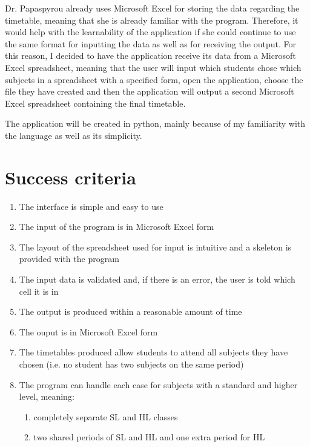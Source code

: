 \documentclass[a4paper, 12pt]{article}
\begin{document}
Dr. Papaspyrou already uses Microsoft Excel for storing the data regarding the timetable,
meaning that she is already familiar with the program. Therefore, it would help with the
learnability of the application if she could continue to use the same format for inputting
the data as well as for receiving the output. For this reason, I decided to have the
application receive its data from a Microsoft Excel spreadsheet, meaning that the user will
input which students chose which subjects in a spreadsheet with a specified form, open the
application, choose the file they have created and then the application will output a second
Microsoft Excel spreadsheet containing the final timetable.

The application will be created in python, mainly because of my familiarity with the
language as well as its simplicity.

\section{Success criteria}

\begin{enumerate}
    \item The interface is simple and easy to use
    \item The input of the program is in Microsoft Excel form
    \item The layout of the spreadsheet used for input is intuitive and a skeleton is
        provided with the program
    \item The input data is validated and, if there is an error, the user is told which cell
        it is in
    \item The output is produced within a reasonable amount of time
    \item The ouput is in Microsoft Excel form
    \item The timetables produced allow students to attend all subjects they have chosen
        (i.e. no student has two subjects on the same period)
    \item The program can handle each case for subjects with a standard and higher level,
        meaning:
        \begin{enumerate}
            \item completely separate SL and HL classes
            \item two shared periods of SL and HL and one extra period for HL
        \end{enumerate}
\end{enumerate}
\end{document}
